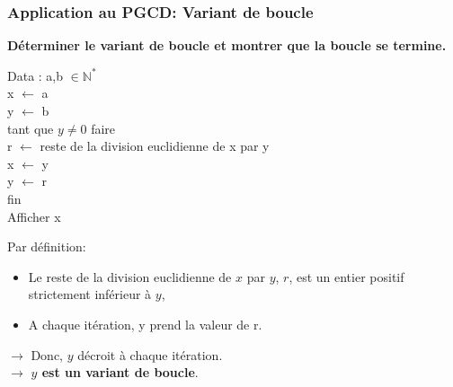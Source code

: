 \begin{frame}[fragile]
\frametitle{Application au PGCD: Variant de boucle}

\textbf{Déterminer le variant de boucle et montrer que la boucle se termine.}

\begin{minipage}{0.4\linewidth}
Data : a,b $\in \mathbb{N}^*$\\
x $\leftarrow$ a \\
y $\leftarrow$ b \\
tant que $y\neq0$ faire \\
\hspace*{0.5cm} r $\leftarrow$ reste de la division euclidienne de x par y \\
\hspace*{0.5cm} x $\leftarrow$ y \\
\hspace*{0.5cm} y $\leftarrow$ r \\
fin \\
Afficher x
\end{minipage}\hfill
\begin{minipage}{0.56\linewidth}

Par définition:
\begin{itemize}
 \item Le reste de la division euclidienne de $x$ par $y$, $r$, est un entier positif strictement inférieur à $y$,
 \item A chaque itération, y prend la valeur de r.
\end{itemize}

$\rightarrow$ Donc, $y$ décroit à chaque itération.\\
$\rightarrow$ \textbf{$y$ est un variant de boucle}.

\end{minipage}

\vspace{2cm}

\end{frame}

